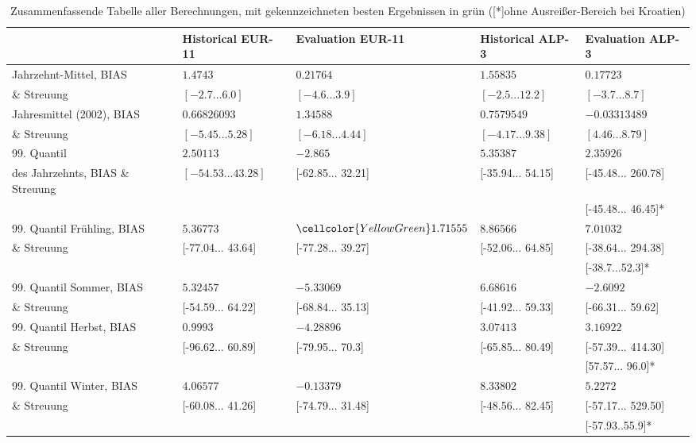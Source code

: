 \begin{table}[h!]
	\begin{tabularx}{\textwidth}{X|X|X|X|X|}
		\cline{2-5}
		& \textbf{Historical EUR-11} & \textbf{Evaluation EUR-11}& \textbf{Historical ALP-3} & \textbf{Evaluation ALP-3}\\
		\hline
		Jahrzehnt-Mittel, BIAS& $1.4743$ & $0.21764$ & $1.55835$ & \cellcolor{YellowGreen}$0.17723$\\
		\cline{2-5} \& Streuung& $[-2.7...6.0]$ & \cellcolor{YellowGreen}$[-4.6...3.9]$ &$[-2.5...12.2]$& $[-3.7...8.7]$\\
		\hline\hline
		Jahresmittel (2002), BIAS & $0.66826093$ & $1.34588$ & $0.7579549$&\cellcolor{YellowGreen}$-0.03313489$\\
		\cline{2-5}\& Streuung & $[-5.45...5.28]$ & \cellcolor{YellowGreen}$[-6.18...4.44]$ &$[-4.17...9.38]$& $[4.46...8.79]$\\
		\hline\hline
		99. Quantil& $2.50113$ & $-2.865$ & $5.35387$&\cellcolor{YellowGreen}$2.35926$\\
		\cline{2-5} des Jahrzehnts, BIAS \& Streuung& $[-54.53...43.28]$ &[-62.85... 32.21] &\cellcolor{YellowGreen}[-35.94... 54.15]& [-45.48... 260.78]\\
		\cline{5-5}
		&&&\cellcolor{YellowGreen}&[-45.48... 46.45]* \\
		\hline\hline
		99. Quantil Frühling, BIAS& $5.36773$ & $\cellcolor{YellowGreen}1.71555$ & $8.86566$&$7.01032$\\
		\cline{2-5} \& Streuung	& [-77.04... 43.64] & \cellcolor{YellowGreen}[-77.28... 39.27] & [-52.06... 64.85] & [-38.64... 294.38]\\
		\cline{5-5}&&&&\cellcolor{YellowGreen}[-38.7...52.3]*\\
		\hline
		99. Quantil Sommer, BIAS & $5.32457$ & $-5.33069$ & $6.68616$&\cellcolor{YellowGreen}$-2.6092$\\
		\cline{2-5}  \& Streuung & [-54.59... 64.22] & [-68.84... 35.13] & \cellcolor{YellowGreen}[-41.92... 59.33] & [-66.31... 59.62]\\
		\hline
		99. Quantil Herbst, BIAS & \cellcolor{YellowGreen}$0.9993$ & $-4.28896$ & $3.07413$&$3.16922$\\
		\cline{2-5}\& Streuung& [-96.62... 60.89]& [-79.95... 70.3] & \cellcolor{YellowGreen}[-65.85... 80.49]& [-57.39... 414.30]\\
		\cline{5-5}&&&&[57.57... 96.0]*\\
		\hline
		99. Quantil Winter, BIAS& \cellcolor{YellowGreen}$4.06577$ & $-0.13379$ & $8.33802$&$5.2272$\\
		\cline{2-5}\& Streuung & [-60.08... 41.26] & \cellcolor{YellowGreen}[-74.79... 31.48] & [-48.56... 82.45] & [-57.17... 529.50]\\
		\cline{5-5}&&&&[-57.93..55.9]*\\
		\hline
	\end{tabularx}
	\caption{Zusammenfassende Tabelle aller Berechnungen, mit gekennzeichneten besten Ergebnissen in grün ([*]ohne Ausreißer-Bereich bei Kroatien)}
	\label{tab:appendix}
\end{table}